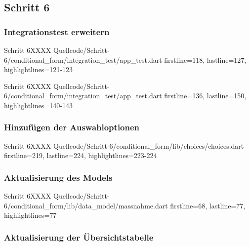 \ifincludeall \clearpage \fi 

\subsection{Schritt 6}


\subsubsection{Integrationstest erweitern}


\begin{alexlisting}{Schritt 6}{XXXX}
  {Quellcode/Schritt-6/conditional_form/integration_test/app_test.dart}
  {firstline=118, lastline=127, highlightlines={121-123}}
  \label{lst:Schritt6XXXX}
\end{alexlisting}


\begin{alexlisting}{Schritt 6}{XXXX}
  {Quellcode/Schritt-6/conditional_form/integration_test/app_test.dart}
  {firstline=136, lastline=150, highlightlines={140-143}}
  \label{lst:Schritt6XXXX}
\end{alexlisting}

\subsubsection{Hinzufügen der Auswahloptionen}


\begin{alexlisting}{Schritt 6}{XXXX}
  {Quellcode/Schritt-6/conditional_form/lib/choices/choices.dart}
  {firstline=219, lastline=224, highlightlines={223-224}}
  \label{lst:Schritt6XXXX}
\end{alexlisting}

\subsubsection{Aktualisierung des Models}


\begin{alexlisting}{Schritt 6}{XXXX}
  {Quellcode/Schritt-6/conditional_form/lib/data_model/massnahme.dart}
  {firstline=68, lastline=77, highlightlines={77}}
  \label{lst:Schritt6XXXX}
\end{alexlisting}

\subsubsection{Aktualisierung der Übersichtstabelle}

